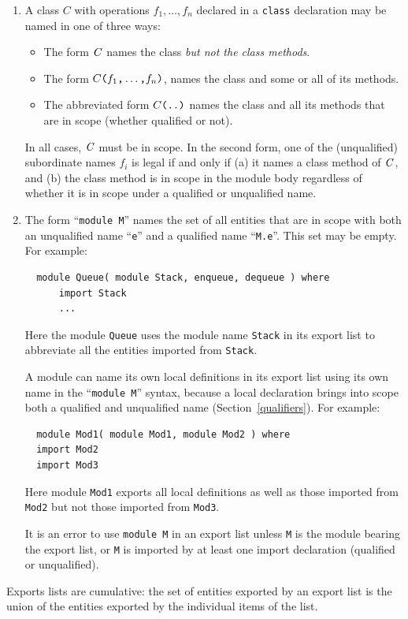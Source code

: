 \begin{enumerate}
\item
{}
A class $C$ with operations $f_1,\ldots,f_n$
declared in a \mbox{\tt class} declaration may be named in one of three ways:
\begin{itemize}
\item
The form \mbox{$\it C$} names the class {\em but not the class methods}.
\item
The form $C\mbox{\tt (}f_1\mbox{\tt ,}\ldots\mbox{\tt ,}f_n\mbox{\tt )}$, names the class and some or all
of its methods.  
\item
The abbreviated form $C\mbox{\tt (..)}$ names the class and all its methods
that are in scope (whether qualified or not).
\end{itemize}
In all cases, \mbox{$\it C$} must be in scope.  In the second form,
one of the (unqualified) subordinate names $f_i$ is legal if and only if (a) it names a
class method of \mbox{$\it C$}, and (b) the class method 
is in scope in the module body regardless of whether it is in scope
under a qualified or unqualified name.

\item
The form ``\mbox{\tt module\ M}'' names the set of all entities that are in
scope with both an unqualified name ``\mbox{\tt e}'' and a qualified name
``\mbox{\tt M.e}''.
This set may be empty.
For example:
\bprog
{\small\begin{verbatim}
  module Queue( module Stack, enqueue, dequeue ) where
      import Stack
      ...
\end{verbatim}}
\eprog
Here the module \mbox{\tt Queue} uses the module name \mbox{\tt Stack} in its export
list to abbreviate all the entities imported from \mbox{\tt Stack}.  

A module can name its own local definitions in its export
list using its own name in the ``\mbox{\tt module\ M}'' syntax, because a local
declaration brings into scope both a qualified and unqualified name (Section~\ref{qualifiers}). 
For example:
\bprog
{\small\begin{verbatim}
  module Mod1( module Mod1, module Mod2 ) where
  import Mod2
  import Mod3
\end{verbatim}}
\eprog
Here module \mbox{\tt Mod1} exports all local definitions as well as those
imported from \mbox{\tt Mod2} but not those imported from \mbox{\tt Mod3}.

It is an error to use \mbox{\tt module\ M} in an export list unless \mbox{\tt M} is 
the module bearing the export list, or \mbox{\tt M} is imported by at 
least one import declaration (qualified or unqualified).
\end{enumerate}
Exports lists are cumulative: the set of entities exported by an export
list is the union of the entities exported by the individual items of the list.

